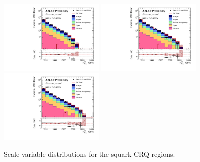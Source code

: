 \begin{figure}[tbph]
\begin{center}
\includegraphics[width=0.45\textwidth]{figures/ATLAS-CONF-2016-078_INT/N-1Plots/AtlasStyle/Preliminary/CRQ_SRJigsawSRS2b_LastCut_CRQ_minusone}
\includegraphics[width=0.45\textwidth]{figures/ATLAS-CONF-2016-078_INT/N-1Plots/AtlasStyle/Preliminary/CRQ_SRJigsawSRS3a_LastCut_CRQ_minusone}
\includegraphics[width=0.45\textwidth]{figures/ATLAS-CONF-2016-078_INT/N-1Plots/AtlasStyle/Preliminary/CRQ_SRJigsawSRS3b_LastCut_CRQ_minusone}
\end{center}
\caption{Scale variable distributions for the squark CRQ regions.}
\label{fig:CRQ_SRJigsawSRS1a_LastCut_CRQ_minusone}
\end{figure}
